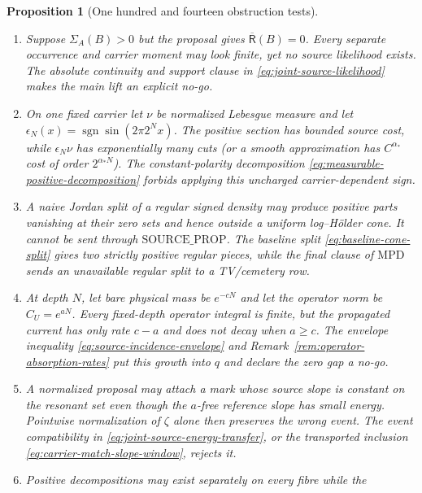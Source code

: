 \documentclass[11pt]{article}
\newtheorem{proposition}[theorem]{Proposition}
\begin{document}
\begin{proposition}[One hundred and fourteen obstruction tests]
\begin{enumerate}[label=\textup{(T\arabic*)}]
      $\|d\mathsf R_0(\cdot\mid A)/d\mathsf R_0\|_p
       =\delta^{-1/p'}$.  A scale-free normalized selected likelihood would
      hide exactly this blow-up.  Equation
      \eqref{eq:selection-safe-likelihood-rates} records it, and
      \eqref{eq:source-value-small-ball} rejects a nonpositive resulting
      gap.
\item Suppose $\Sigma_A(B)>0$ but the proposal gives
      $\overline{\mathsf R}(B)=0$.  Every separate occurrence and carrier
      moment may look finite, yet no source likelihood exists.  The absolute
      continuity and support clause in \eqref{eq:joint-source-likelihood}
      makes the main lift an explicit no-go.
\item On one fixed carrier let $\nu$ be normalized Lebesgue measure and let
      $\epsilon_N(x)=\operatorname{sgn}\sin(2\pi2^Nx)$.  The positive
      section has bounded source cost, while $\epsilon_N\nu$ has
      exponentially many cuts (or a smooth approximation has
      $C^{\alpha_*}$ cost of order $2^{\alpha_*N}$).  The constant-polarity
      decomposition \eqref{eq:measurable-positive-decomposition} forbids
      applying this uncharged carrier-dependent sign.
\item A naive Jordan split of a regular signed density may produce positive
      parts vanishing at their zero sets and hence outside a uniform
      log--H\"older cone.  It cannot be sent through
      $\mathrm{SOURCE\_PROP}$.  The baseline split
      \eqref{eq:baseline-cone-split} gives two strictly positive regular
      pieces, while the final clause of $\mathrm{MPD}$ sends an unavailable
      regular split to a TV/cemetery row.
\item At depth $N$, let bare physical mass be $e^{-cN}$ and let the operator
      norm be $C_U=e^{aN}$.  Every fixed-depth operator integral is finite,
      but the propagated current has only rate $c-a$ and does not decay when
      $a\ge c$.  The envelope inequality
      \eqref{eq:source-incidence-envelope} and
      Remark~\ref{rem:operator-absorption-rates} put this growth into $q$ and
      declare the zero gap a no-go.
\item A normalized proposal may attach a mark whose source slope is constant
      on the resonant set even though the $a$-free reference slope has small
      energy.  Pointwise normalization of $\zeta$ alone then preserves the
      wrong event.  The event compatibility in
      \eqref{eq:joint-source-energy-transfer}, or the transported inclusion
      \eqref{eq:carrier-match-slope-window}, rejects it.
\item Positive decompositions may exist separately on every fibre while the

\end{enumerate}
\end{proposition}
\end{document}
